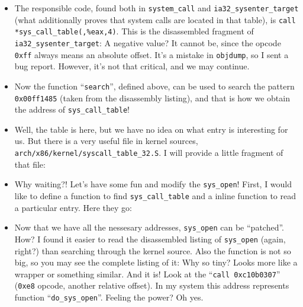 \documentclass[12pt]{book}
\begin{document}
  \begin{itemize}
  \item The responsible code, found both in \verb!system_call! and
    \verb!ia32_sysenter_target! (what additionally proves that system calls
    are located in that table), is \verb!call *sys_call_table(,%eax,4)!. This
    is the disassembled fragment of \verb!ia32_sysenter_target!:
     A negative value?  It cannot be, since the
    opcode \verb!0xff! always means an absolute offset. It's a mistake in
    \verb!objdump!, so I sent a bug report. However, it's not that critical,
    and we may continue.

  \item Now the function ``\verb!search!'', defined above, can be used to
    search the pattern \verb!0x00ff1485! (taken from the disassembly listing),
    and that is how we obtain the address of \verb!sys_call_table!!

  \item Well, the table is here, but we have no idea on what entry is
    interesting for us. But there is a very useful file in kernel sources,
    \verb!arch/x86/kernel/syscall_table_32.S!. I will provide a little
    fragment of that file: 

  \item Why waiting?! Let's have some fun and modify the \verb!sys_open!!
    First, I would like to define a function to find \verb!sys_call_table! and
    a inline function to read a particular entry. Here they go:
    

  \item Now that we have all the nessesary addresses, \verb!sys_open! can be
    ``patched''. How? I found it easier to read the disassembled listing of
    \verb!sys_open! (again, right?) than searching through the kernel
    source. Also the function is not so big, so you may see the complete
    listing of it:  Why so tiny? Looks more like a
    wrapper or something similar. And it is! Look at the
    ``\verb!call 0xc10b0307!'' (\verb!0xe8! opcode, another relative
    offset). In my system this address represents function
    ``\verb!do_sys_open!''. Feeling the power? Oh yes.


\end{itemize}
\end{document}
